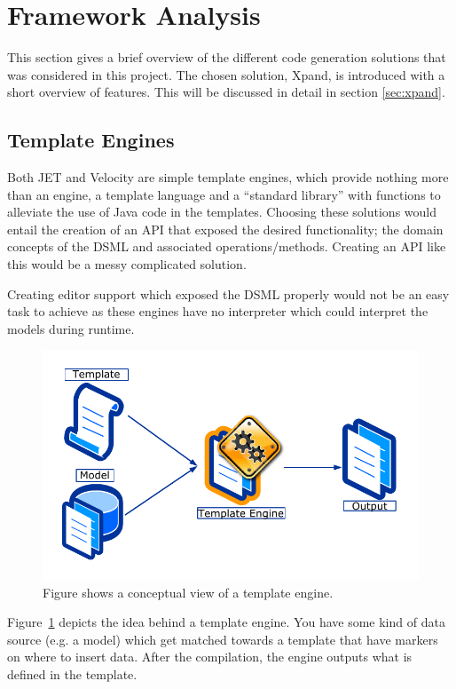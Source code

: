 \section{Framework Analysis}\label{sec:framework_analysis}
This section gives a brief overview of the different code generation solutions that was considered in this project. The chosen solution, Xpand, is introduced with a short overview of features. This will be discussed in detail in section \ref{sec:xpand}.

\subsection{Template Engines}
Both JET and Velocity are simple template engines, which provide nothing more than an engine, a template language and a “standard library” with functions to alleviate the use of Java code in the templates. Choosing these solutions would entail the creation of an API that exposed the desired functionality; the domain concepts of the DSML and associated operations/methods. Creating an API like this would be a messy complicated solution. 

Creating editor support which exposed the DSML properly would not be an easy task to achieve as these engines have no interpreter which could interpret the models during runtime.
\begin{figure}[pb]
    \centering
    \centerline{\includegraphics[scale=0.8]{images/TemplateGeneration.pdf}}
    \caption[Template engine]{Figure shows a conceptual view of a template engine.}
    \label{fig:template_engine}
\end{figure}
Figure~\ref{fig:template_engine} depicts the idea behind a template engine. You have some kind of data source (e.g. a model) which get matched towards a template that have markers on where to insert data. After the compilation, the engine outputs what is defined in the template.

